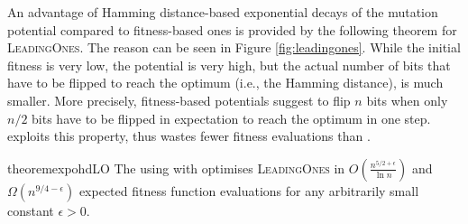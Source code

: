 \documentclass[lettersize,journal]{IEEEtran}
\begin{document}
An advantage of Hamming distance-based exponential decays of the mutation potential
compared to fitness-based ones is provided by the following theorem for \textsc{LeadingOnes}.
The reason can be seen in Figure \ref{fig:leadingones}.  While the initial fitness is very low, the potential is very high, but the actual number of bits that have to be flipped to reach the optimum (i.e., the Hamming distance), is much smaller. More precisely, fitness-based potentials suggest to flip $n$ bits when only $n/2$ bits have to be flipped in expectation to reach the optimum in one step. 
{\expoHD } exploits this property, thus wastes fewer fitness evaluations than \expoF. 

\begin{restatable}{theorem}{expohdLO}\label{thm:expohdLO}
The {\oneoneIA } using \IPHfcm{} with {\expoHD } optimises \textsc{LeadingOnes} in 
$O(\frac{n^{5/2+\epsilon}}{\ln n})$ and $\Omega(n^{9/4-\epsilon})$ expected 
fitness function evaluations for any arbitrarily small constant $\epsilon>0$. 
\end{restatable}
\end{document}
